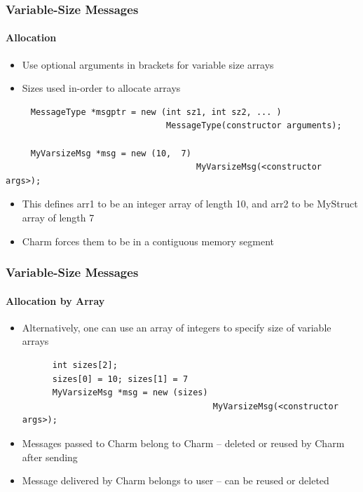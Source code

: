 \begin{frame}[fragile]
  \frametitle{Variable-Size Messages}
  \framesubtitle{Allocation}
  \begin{itemize}
    \item Use optional arguments in brackets for variable size arrays
    \item Sizes used in-order to allocate arrays
  \end{itemize}
  \begin{lstlisting}
     MessageType *msgptr = new (int sz1, int sz2, ... ) 
                                MessageType(constructor arguments);

     MyVarsizeMsg *msg = new (10,  7)        
                                      MyVarsizeMsg(<constructor args>);
  \end{lstlisting}
  \begin{itemize}
    \item This defines arr1 to be an integer array of length 10, and arr2 to be MyStruct array of length 7
    \item Charm forces them to be in a contiguous memory segment
  \end{itemize}
\end{frame}

\begin{frame}[fragile]
  \frametitle{Variable-Size Messages}
  \framesubtitle{Allocation by Array}
  \begin{itemize}
    \item Alternatively, one can use an array of integers to specify size of variable arrays
    \begin{lstlisting}
      int sizes[2]; 
      sizes[0] = 10; sizes[1] = 7
      MyVarsizeMsg *msg = new (sizes)        
                                      MyVarsizeMsg(<constructor args>);
    \end{lstlisting}
    \item Messages passed to Charm belong to Charm – deleted or reused by Charm after sending
    \item Message delivered by Charm belongs to user – can be reused or deleted
  \end{itemize}
\end{frame}

